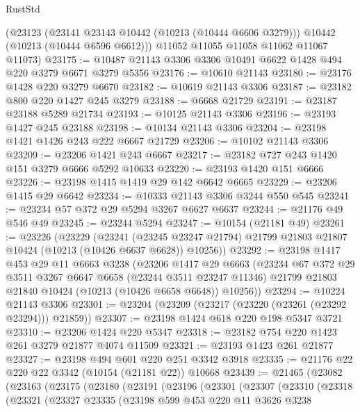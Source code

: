 \begin{lexlean}{RustStd}
\begin{coremodule}
{\begin{coremodule}
{{{{{{{{{{{{{{{{{{{{{{{{{{      (@23123
        (@23141 @23143 @10442 (@10213 (@10444 @6606 @3279)))
        @10442
        (@10213 (@10444 @6596 @6612)))
      @11052
      @11055
      @11058
      @11062
      @11067
      @11073)
@23175 := @10487 @21143 @3306 @3306 @10491 @6622 @1428 @494 @220 @3279 @6671 @3279 @5356
@23176 := @10610 @21143
@23180 := @23176 @1428 @220 @3279 @6670
@23182 := @10619 @21143 @3306
@23187 := @23182 @800 @220 @1427 @245 @3279
@23188 := @6668 @21729
@23191 := @23187 @23188 @5289 @21734
@23193 := @10125 @21143 @3306
@23196 := @23193 @1427 @245 @23188
@23198 := @10134 @21143 @3306
@23204 := @23198 @1421 @1426 @243 @222 @6667 @21729
@23206 := @10102 @21143 @3306
@23209 := @23206 @1421 @243 @6667
@23217 := @23182 @727 @243 @1420 @151 @3279 @6666 @5292 @10633
@23220 := @23193 @1420 @151 @6666
@23226 := @23198 @1415 @1419 @29 @142 @6642 @6665
@23229 := @23206 @1415 @29 @6642
@23234 := @10333 @21143 @3306 @3244 @550 @545
@23241 := @23234 @57 @372 @29 @5294 @3267 @6627 @6637
@23244 := @21176 @49 @546 @49
@23245 := @23244 @5294
@23247 := @10154 (@21181 @49)
@23261 := @23226
    (@23229
      (@23241
        (@23245 @23247 @21794)
        @21799
        @21803
        @21807
        @10424
        (@10213 (@10426 @6637 @6628))
        @10256))
@23292 := @23198
    @1417
    @453
    @29
    @11
    @6663
    @3238
    (@23206
      @1417
      @29
      @6663
      (@23234
        @67
        @372
        @29
        @3511
        @3267
        @6647
        @6658
        (@23244 @3511 @23247 @11346)
        @21799
        @21803
        @21840
        @10424
        (@10213 (@10426 @6658 @6648))
        @10256))
@23294 := @10224 @21143 @3306
@23301 := @23204 (@23209 (@23217 (@23220 (@23261 (@23292 @23294))) @21859))
@23307 := @23198 @1424 @618 @220 @198 @5347 @3721
@23310 := @23206 @1424 @220 @5347
@23318 := @23182 @754 @220 @1423 @261 @3279 @21877 @4074 @11509
@23321 := @23193 @1423 @261 @21877
@23327 := @23198 @494 @601 @220 @251 @3342 @3918
@23335 := @21176 @22 @220 @22 @3342 (@10154 (@21181 @22)) @10668
@23439 := @21465
    (@23082
      (@23163
        (@23175
          (@23180
            (@23191
              (@23196
                (@23301
                  (@23307
                    (@23310
                      (@23318
                        (@23321
                          (@23327
                            @23335
                            (@23198
                              @599
                              @453
                              @220
                              @11
                              @3626
                              @3238
}}}}}}}}}}}}}}}}}}}}}}}}}}
\end{coremodule}}
\end{coremodule}
\end{lexlean}
